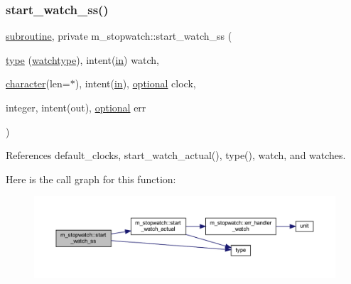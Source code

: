 \subsubsection{\texorpdfstring{start\+\_\+watch\+\_\+ss()}{start\_watch\_ss()}}
{\footnotesize\ttfamily \hyperlink{M__stopwatch_83_8txt_acfbcff50169d691ff02d4a123ed70482}{subroutine}, private m\+\_\+stopwatch\+::start\+\_\+watch\+\_\+ss (\begin{DoxyParamCaption}\item[{\hyperlink{stop__watch_83_8txt_a70f0ead91c32e25323c03265aa302c1c}{type} (\hyperlink{structm__stopwatch_1_1watchtype}{watchtype}), intent(\hyperlink{M__journal_83_8txt_afce72651d1eed785a2132bee863b2f38}{in})}]{watch,  }\item[{\hyperlink{option__stopwatch_83_8txt_abd4b21fbbd175834027b5224bfe97e66}{character}(len=$\ast$), intent(\hyperlink{M__journal_83_8txt_afce72651d1eed785a2132bee863b2f38}{in}), \hyperlink{option__stopwatch_83_8txt_aa4ece75e7acf58a4843f70fe18c3ade5}{optional}}]{clock,  }\item[{integer, intent(out), \hyperlink{option__stopwatch_83_8txt_aa4ece75e7acf58a4843f70fe18c3ade5}{optional}}]{err }\end{DoxyParamCaption})\hspace{0.3cm}{\ttfamily [private]}}



References default\+\_\+clocks, start\+\_\+watch\+\_\+actual(), type(), watch, and watches.

Here is the call graph for this function\+:
\nopagebreak
\begin{figure}[H]
\begin{center}
\leavevmode
\includegraphics[width=350pt]{namespacem__stopwatch_a8be3c59cc9a0333ebe966ae718d1d856_cgraph}
\end{center}
\end{figure}
\mbox{\label{namespacem__stopwatch_afa380a4a41a9059977ffef300380d8f2}} 
